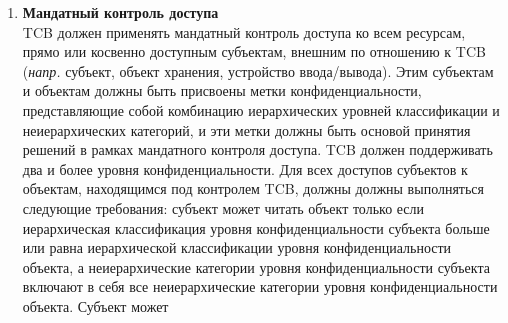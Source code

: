 \begin{enumerate}
\begin{enumerate}
\begin{enumerate}
\begin{enumerate}
\begin{itemize}
					должны однозначно соответствовать внутренним меткам и быть ассоциированы с экспортируемой информацией.
					\item{\textbf{Экспорт маркированной информации}}\\
					TCB должен классифицировать каждый канал связи и устройство ввода/вывода как одноуровневый или многоуровневый (\textit{прим. } передается ли метка конфиденциальности вместе с данными
					или нет). Любое изменение этой классификации должно производиться вручную и проверяться TCB. TCB должен поддерживать и иметь возможность проверять любые изменения в уровне
					конфиденциальности или классификации, связанной с каналом связи или устройством ввода/вывода.
					\item{\textbf{Метки конфиденциальности субъекта}}\\
					TCB должен немедленно уведомлять пользователя терминала о каждом изменении уровня конфиденциальности, связанного с этим пользователем во время интерактивного сеанса. Пользователь
					терминала должен иметь возможность запросить TCB по желанию отображение полной метки конфиденциальности субъекта.
					\item{\textbf{Метки устройств}}\\
					TCB должен поддерживать назначение минимального и максимальных уровней конфиденциальности для всех подключенных физических устройств. Эти уровни конфиденциальности должны
					использоваться TCB для обеспечения соблюдения ограничений, накладываемых физической средой, в которой находятся устройства.
				\end{itemize}
				\item{\textbf{Мандатный контроль доступа}}\\
				TCB должен применять мандатный контроль доступа ко всем ресурсам, прямо или косвенно доступным субъектам, внешним по отношению к TCB (\textit{напр.} субъект, объект хранения,
				устройство ввода/вывода). Этим субъектам и объектам должны быть присвоены метки конфиденциальности, представляющие собой комбинацию иерархических уровней классификации и неиерархических категорий, и эти метки должны быть основой принятия
				решений в рамках мандатного контроля доступа. TCB должен поддерживать два и более уровня конфиденциальности. Для всех доступов субъектов к объектам, находящимся под контролем  TCB, должны
				должны выполняться следующие требования: субъект может читать объект только если иерархическая классификация уровня конфиденциальности субъекта больше или равна иерархической классификации
				уровня конфиденциальности объекта, а неиерархические категории уровня конфиденциальности субъекта включают в себя все неиерархические категории уровня конфиденциальности объекта. Субъект может

\end{enumerate}
\end{enumerate}
\end{enumerate}
\end{enumerate}
